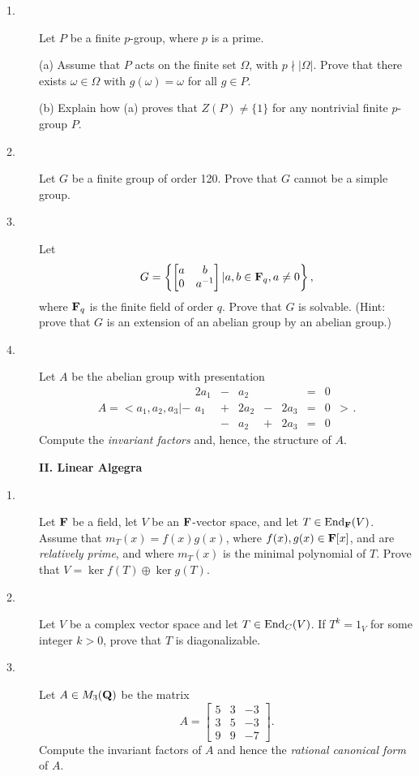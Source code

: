 \documentclass{article}
\begin{document}
\begin{description}
\item[1.]
Let $P$ be a finite $p$-group, where $p$ is a prime.

\item[\quad] (a)
Assume that $P$ acts on the finite set $\Omega$, with $p \nmid |\Omega|$.
Prove that there exists $\omega \in \Omega$ with $g(\omega) = \omega$ for
all $g \in P$.

\item[\quad] (b)
Explain how (a) proves that $Z(P) \neq \{1\}$ for any nontrivial finite
$p$-group $P$.

\item[2.]
Let $G$ be a finite group of order 120. Prove that $G$ cannot be a simple
group.

\item[3.]
Let
$$G= \left\{ \left[ \begin{matrix} a&b \\ 0&a^{-1} \end{matrix} \right]
  | a,b \in {\bf F}_q, a \neq 0 \right\}, $$
where ${\bf F}_q$ is the finite field of order $q$. Prove that $G$ is
solvable. (Hint: prove that $G$ is an extension of an abelian group by an
abelian group.)

\item[4.]
Let $A$ be the abelian group with presentation
$$A= < a_1, a_2, a_3 | -
  \begin{matrix}
        2a_1 & - & a_2 &&& = & 0 & \\
        a_1 & + & 2a_2 & - & 2a_3 & = & 0 & > \\
        & - & a_2 & + & 2a_3 & = & 0 &
        \end{matrix}.$$
Compute the {\it invariant factors} and, hence, the structure of $A$.

\centerline{{\bf II. Linear Algegra}}

\item[1.]
Let ${\bf F}$ be a field, let $V$ be an ${\bf F}$-vector space, and let
$T \in \hbox{End}_{\bf F} (V)$. Assume that $m_T(x) = f(x) g(x)$, where
$f(x), g(x) \in {\bf F} [x]$, and are {\it relatively prime}, and where
$m_T(x)$ is the minimal polynomial of $T$. Prove that
$V = \ker f(T) \oplus \ker g(T)$.

\item[2.]
Let $V$ be a complex vector space and let $T \in \hbox{End}_C (V)$. If
$T^k = 1_V$ for some integer $k>0$, prove that $T$ is diagonalizable.

\item[3.]
Let $A \in M_3({\bf Q})$ be the matrix
$$A = \left[ \begin{matrix}
        5&3&-3 \\
        3&5&-3 \\
        9&9&-7
        \end{matrix} \right].$$
Compute the invariant factors of $A$ and hence the {\it rational canonical
form} of $A$.


\end{description}
\end{document}
